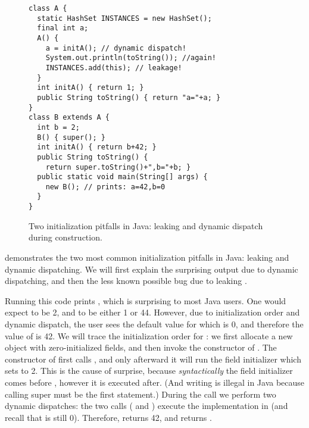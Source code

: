 \begin{figure}
\begin{lstlisting}
class A {
  static HashSet INSTANCES = new HashSet();
  final int a;
  A() {
    a = initA(); // dynamic dispatch!
    System.out.println(toString()); //again!
    INSTANCES.add(this); // leakage!
  }
  int initA() { return 1; }
  public String toString() { return "a="+a; }
}
class B extends A {
  int b = 2;
  B() { super(); }
  int initA() { return b+42; }
  public String toString() {
    return super.toString()+",b="+b; }
  public static void main(String[] args) {
    new B(); // prints: a=42,b=0
  }
}
\end{lstlisting}
\caption{Two initialization pitfalls in Java:
    leaking \this and dynamic dispatch during construction.}
\label{Figure:TwoPitfalls}
\end{figure}

 demonstrates the two most common initialization pitfalls in Java:
    leaking \this and dynamic dispatching.
We will first explain the surprising output due to dynamic dispatching,
    and then the less known possible bug due to leaking \this.

Running this code prints , which is
    surprising to most Java users.
One would expect  to be 2, and  to be either 1 or 44.
However, due to initialization order and dynamic dispatch,
    the user sees the default value for  which is 0,
    and therefore the value of  is 42.
We will trace the initialization order for :
    we first allocate a new object with zero-initialized fields,
    and then invoke the constructor of .
The constructor of  first calls ,
    and only afterward it will run the field initializer which sets  to 2.
This is the cause of surprise, because \emph{syntactically} the field initializer comes before
    ,
    however it is executed after.
(And writing  is illegal in Java because
    calling super must be the first statement.)
During the  call we perform two dynamic dispatches:
    the two calls ( and )
    execute the implementation in  (and recall that  is still 0).
Therefore,  returns 42, and  returns .

